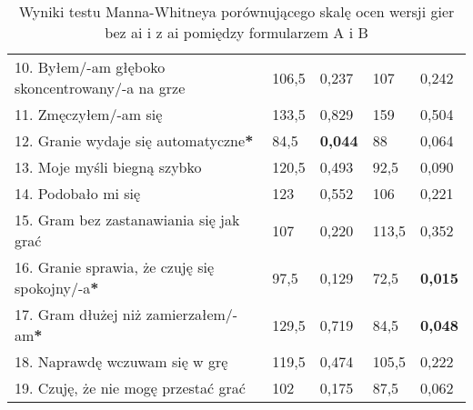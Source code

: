 \begin{table}[h!]
\begin{center}
\begin{tabular}{|m{10em}|m{5em}|m{5em}|m{5em}|m{5em}|}
            10. Byłem/-am głęboko \newline skoncentrowany/-a \newline na grze & 106,5                             & 0,237                  & 107                           & 0,242              \\
            11. Zmęczyłem/-am się                                             & 133,5                             & 0,829                  & 159                           & 0,504              \\
            12. Granie wydaje się automatyczne\textbf{*}                      & 84,5                              & \textbf{0,044}         & 88                            & 0,064              \\
            13. Moje myśli \newline biegną szybko                             & 120,5                             & 0,493                  & 92,5                          & 0,090              \\
            14. Podobało mi się                                               & 123                               & 0,552                  & 106                           & 0,221              \\
            15. Gram bez zastanawiania się jak grać                           & 107                               & 0,220                  & 113,5                         & 0,352              \\
            16. Granie sprawia, \newline że czuję się spokojny/-a\textbf{*}   & 97,5                              & 0,129                  & 72,5                          & \textbf{0,015}     \\
            17. Gram dłużej \newline niż zamierzałem/-am\textbf{*}            & 129,5                             & 0,719                  & 84,5                          & \textbf{0,048}     \\
            18. Naprawdę wczuwam się w grę                                    & 119,5                             & 0,474                  & 105,5                         & 0,222              \\
            19. Czuję, że nie mogę przestać grać                              & 102                               & 0,175                  & 87,5                          & 0,062              \\
            \hline
        \end{tabular}
    \end{center}
    \caption{Wyniki testu Manna-Whitneya porównującego skalę ocen wersji gier bez \gls{ai} i z \gls{ai} pomiędzy formularzem A i B}\label{tab1:ch7_14}
\end{table}

